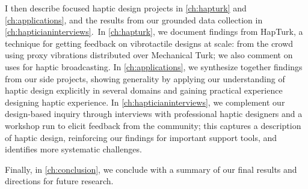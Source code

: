 I then describe focused haptic design projects in \autoref{ch:hapturk} and \autoref{ch:applications}, and the results from our grounded data collection in \autoref{ch:hapticianinterviews}.\
In \autoref{ch:hapturk}, we document findings from HapTurk, a technique for getting feedback on vibrotactile designs at scale: from the crowd using proxy vibrations distributed over Mechanical Turk; we also comment on uses for haptic broadcasting.
In \autoref{ch:applications}, we synthesize together findings from our side projects, showing generality by applying our understanding of haptic design explicitly in several domains and gaining practical experience designing haptic experience.
In \autoref{ch:hapticianinterviews}, we complement our design-based inquiry through interviews with professional haptic designers and a workshop run to elicit feedback from the community; this captures a description of haptic design, reinforcing our findings for important support tools, and identifies more systematic challenges.

Finally, in \autoref{ch:conclusion}, we conclude with a summary of our final results and directions for future research.


%
%
\endinput

Any text after an \endinput is ignored.
You could put scraps here or things in progress.

